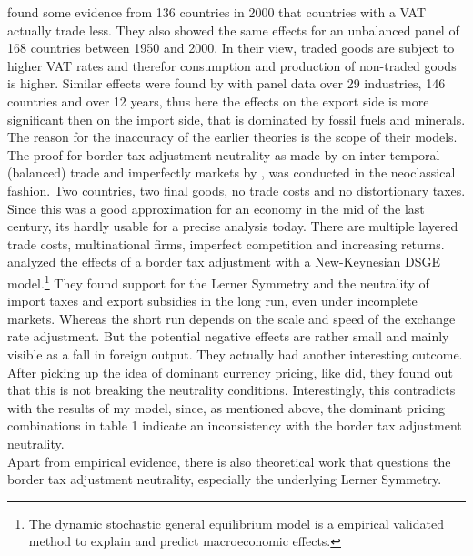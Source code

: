 \cite{hines2005value} found some evidence from 136 countries in 2000 that countries with a VAT actually trade less. They also showed the same effects for an unbalanced panel of 168 countries between 1950 and 2000. In their view, traded goods are subject to higher VAT rates and therefor consumption and production of non-traded goods is higher. Similar effects were found by \cite{nicholson2010value} with panel data over 29 industries, 146 countries and over 12 years, thus here the effects on the export side is more significant then on the import side, that is dominated by fossil fuels and minerals. 
The reason for the inaccuracy of the earlier theories is the scope of their models. The proof for border tax adjustment neutrality as made by \cite{Feldstein&Krugman} on inter-temporal (balanced) trade and imperfectly markets by \cite{ray1975impact}, was conducted in the neoclassical fashion. Two countries, two final goods, no trade costs and no distortionary taxes. Since this was a good approximation for an economy in the mid of the last century, its hardly usable for a precise analysis today. There are multiple layered trade costs, multinational firms, imperfect competition and increasing returns. \cite{linde2017macroeconomic} analyzed the effects of a border tax adjustment with a New-Keynesian DSGE model.\footnote{The dynamic stochastic general equilibrium model is a empirical validated method to explain and predict macroeconomic effects.} They found support for the Lerner Symmetry and the neutrality of import taxes and export subsidies in the long run, even under incomplete markets. Whereas the short run depends on the scale and speed of the exchange rate adjustment. But the potential negative effects are rather small and mainly visible as a fall in foreign output. They actually had another interesting outcome. After picking up the idea of dominant currency pricing, like \cite{casas2017dominant} did, they found out that this is not breaking the neutrality conditions. Interestingly, this contradicts with the results of my model, since, as mentioned above, the dominant pricing combinations in table 1 indicate an inconsistency with the border tax adjustment neutrality.~\\

Apart from empirical evidence, there is also theoretical work that questions the border tax adjustment neutrality, especially the underlying Lerner Symmetry.

